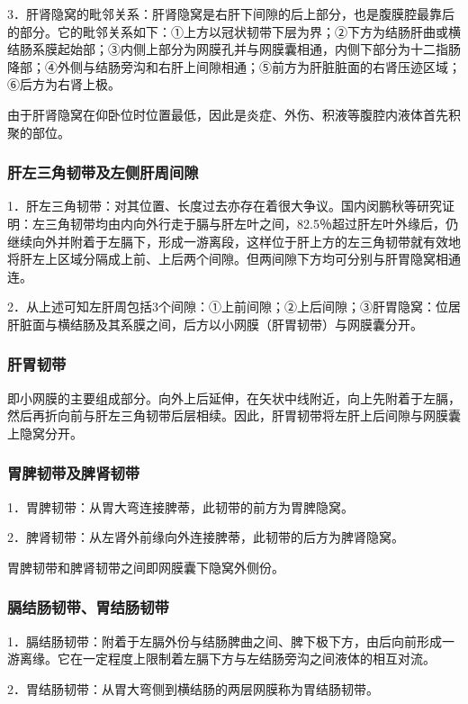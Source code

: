 3．肝肾隐窝的毗邻关系：肝肾隐窝是右肝下间隙的后上部分，也是腹膜腔最靠后的部分。它的毗邻关系如下：①上方以冠状韧带下层为界；②下方为结肠肝曲或横结肠系膜起始部；③内侧上部分为网膜孔并与网膜囊相通，内侧下部分为十二指肠降部；④外侧与结肠旁沟和右肝上间隙相通；⑤前方为肝脏脏面的右肾压迹区域；⑥后方为右肾上极。

由于肝肾隐窝在仰卧位时位置最低，因此是炎症、外伤、积液等腹腔内液体首先积聚的部位。

\subsubsection{肝左三角韧带及左侧肝周间隙}

1．肝左三角韧带：对其位置、长度过去亦存在着很大争议。国内闵鹏秋等研究证明：左三角韧带均由内向外行走于膈与肝左叶之间，82.5％超过肝左叶外缘后，仍继续向外并附着于左膈下，形成一游离段，这样位于肝上方的左三角韧带就有效地将肝左上区域分隔成上前、上后两个间隙。但两间隙下方均可分别与肝胃隐窝相通连。

2．从上述可知左肝周包括3个间隙：①上前间隙；②上后间隙；③肝胃隐窝：位居肝脏面与横结肠及其系膜之间，后方以小网膜（肝胃韧带）与网膜囊分开。

\subsubsection{肝胃韧带}

即小网膜的主要组成部分。向外上后延伸，在矢状中线附近，向上先附着于左膈，然后再折向前与肝左三角韧带后层相续。因此，肝胃韧带将左肝上后间隙与网膜囊上隐窝分开。

\subsubsection{胃脾韧带及脾肾韧带}

1．胃脾韧带：从胃大弯连接脾蒂，此韧带的前方为胃脾隐窝。

2．脾肾韧带：从左肾外前缘向外连接脾蒂，此韧带的后方为脾肾隐窝。

胃脾韧带和脾肾韧带之间即网膜囊下隐窝外侧份。

\subsubsection{膈结肠韧带、胃结肠韧带}

1．膈结肠韧带：附着于左膈外份与结肠脾曲之间、脾下极下方，由后向前形成一游离缘。它在一定程度上限制着左膈下方与左结肠旁沟之间液体的相互对流。

2．胃结肠韧带：从胃大弯侧到横结肠的两层网膜称为胃结肠韧带。

